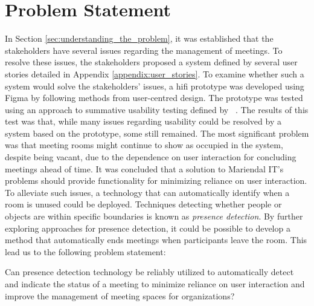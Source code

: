 \section{Problem Statement}\label{sec:problem_statement}
In Section \ref{sec:understanding_the_problem}, it was established that the stakeholders have several issues regarding the management of meetings. 
To resolve these issues, the stakeholders proposed a system defined by several user stories detailed in Appendix \ref{appendix:user_stories}. 
To examine whether such a system would solve the stakeholders' issues, a hifi prototype was developed using Figma\cite{Figma} by following methods from user-centred design.
The prototype was tested using an approach to summative usability testing defined by \citeauthor{lazar2005web}~\cite{lazar2005web}. 
The results of this test was that, while many issues regarding usability could be resolved by a system based on the prototype, some still remained. 
The most significant problem was that meeting rooms might continue to show as occupied in the system, despite being vacant, due to the dependence on user interaction for concluding meetings ahead of time.
It was concluded that a solution to Mariendal IT's problems should provide functionality for minimizing reliance on user interaction.
To alleviate such issues, a technology that can automatically identify when a room is unused could be deployed. 
Techniques detecting whether people or objects are within specific boundaries is known as \textit{presence detection}.
By further exploring approaches for presence detection, it could be possible to develop a method that automatically ends meetings when participants leave the room.
This lead us to the following problem statement:
\begin{problem_statement}
    Can presence detection technology be reliably utilized to automatically detect and indicate the status of a meeting to minimize reliance on user interaction and improve the management of meeting spaces for organizations? 
\end{problem_statement}

